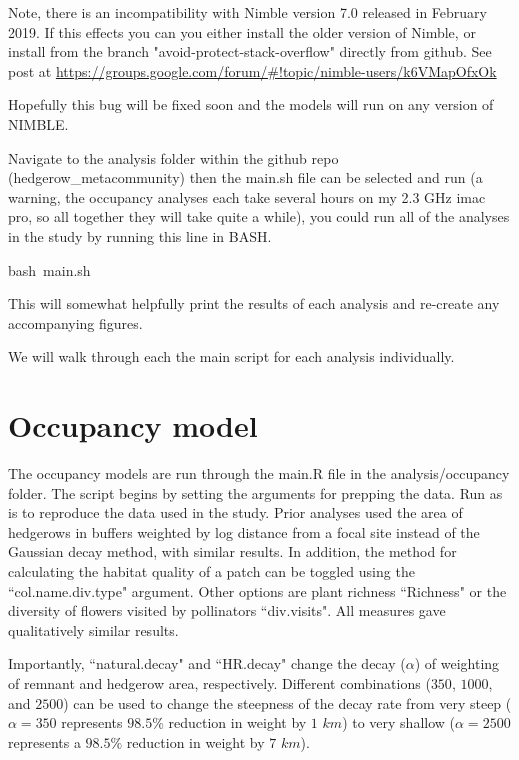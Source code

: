 \documentclass{article}\usepackage[]{graphicx}\usepackage[]{color}
\makeatletter
\newcommand{\hlstd}[1]{\textcolor[rgb]{0.345,0.345,0.345}{#1}}%
\newenvironment{kframe}{%
 \def\at@end@of@kframe{}%
 \ifinner\ifhmode%
  \def\at@end@of@kframe{\end{minipage}}%
  \begin{minipage}{\columnwidth}%
 \fi\fi%
 \def\FrameCommand##1{\hskip\@totalleftmargin \hskip-\fboxsep
 \colorbox{shadecolor}{##1}\hskip-\fboxsep
     \hskip-\linewidth \hskip-\@totalleftmargin \hskip\columnwidth}%
 \MakeFramed {\advance\hsize-\width
   \@totalleftmargin\z@ \linewidth\hsize
   \@setminipage}}%
 {\par\unskip\endMakeFramed%
 \at@end@of@kframe}
\newenvironment{knitrout}{}{} %
\makeatother
\begin{document}
Note, there is an incompatibility with Nimble version 7.0 released in
February 2019. If this effects you can you either install the older
version of Nimble, or install from the branch
"avoid-protect-stack-overflow" directly from github. See post at
\url{https://groups.google.com/forum/#!topic/nimble-users/k6VMapOfxOk}

Hopefully this bug will be fixed soon and the models will run on any
version of NIMBLE.

Navigate to the analysis folder within the github repo
(hedgerow\_metacommunity) then the main.sh file can be selected and
run (a warning, the occupancy analyses each take several hours on my
2.3 GHz imac pro, so all together they will take quite a while), you
could run all of the analyses in the study by running this line in
BASH.

\begin{knitrout}
\color{fgcolor}\begin{kframe}
\noindent
\ttfamily
\hlstd{bash\ main.sh}\hspace*{\fill}
\mbox{}
\normalfont
\end{kframe}
\end{knitrout}

This will somewhat helpfully print the results of each analysis
and re-create any accompanying figures.

We will walk through each the main script for each analysis
individually.

\section{Occupancy model}

The occupancy models are run through the main.R file in the
analysis/occupancy folder. The script begins by setting the arguments
for prepping the data. Run as is to reproduce the data used in the
study. Prior analyses used the area of hedgerows in buffers weighted
by log distance from a focal site instead of the Gaussian decay
method, with similar results. In addition, the method for calculating
the habitat quality of a patch can be toggled using the
``col.name.div.type" argument. Other options are plant richness
``Richness" or the diversity of flowers visited by pollinators
``div.visits". All measures gave qualitatively similar results.

Importantly, ``natural.decay" and ``HR.decay" change the decay
($\alpha$) of weighting of remnant and hedgerow area,
respectively. Different combinations ($350$, $1000$, and $2500$) can
be used to change the steepness of the decay rate from very steep
($\alpha=350$ represents $98.5\%$ reduction in weight by $1$ $km$) to
very shallow ($\alpha=2500$ represents a $98.5\%$ reduction in weight
by $7$ $km$).
\end{document}
